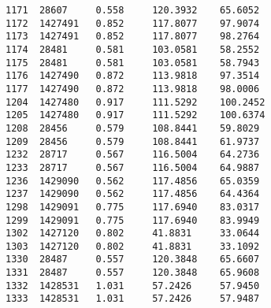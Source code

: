 \documentclass[notitlepage,rmp,aps,10pt]{revtex4-1}
\begin{document}
\begin{verbatim}
1171  28607     0.558     120.3932    65.6052
1172  1427491   0.852     117.8077    97.9074
1173  1427491   0.852     117.8077    98.2764
1174  28481     0.581     103.0581    58.2552
1175  28481     0.581     103.0581    58.7943
1176  1427490   0.872     113.9818    97.3514
1177  1427490   0.872     113.9818    98.0006
1204  1427480   0.917     111.5292    100.2452
1205  1427480   0.917     111.5292    100.6374
1208  28456     0.579     108.8441    59.8029
1209  28456     0.579     108.8441    61.9737
1232  28717     0.567     116.5004    64.2736
1233  28717     0.567     116.5004    64.9887
1236  1429090   0.562     117.4856    65.0359
1237  1429090   0.562     117.4856    64.4364
1298  1429091   0.775     117.6940    83.0317
1299  1429091   0.775     117.6940    83.9949
1302  1427120   0.802     41.8831     33.0644
1303  1427120   0.802     41.8831     33.1092
1330  28487     0.557     120.3848    65.6607
1331  28487     0.557     120.3848    65.9608
1332  1428531   1.031     57.2426     57.9450
1333  1428531   1.031     57.2426     57.9487
\end{verbatim}


\newpage
\end{document}
